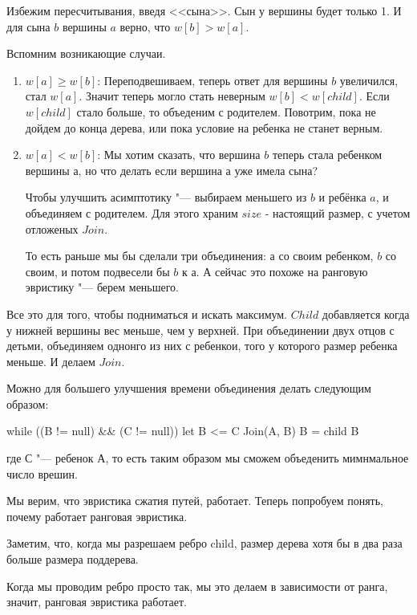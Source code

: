 Избежим пересчитывания, введя <<сына>>. Сын у вершины будет только 1. И для сына $b$ вершины $a$ верно, что $w[b] > w[a]$.

Вспомним возникающие случаи.

\begin{enumerate}
\item
	$w[a] \ge w[b]$:
	Переподвешиваем, теперь ответ для вершины $b$ увеличился, стал $w[a]$.
	Значит теперь могло стать неверным $w[b] < w[child]$.
	Если $w[child]$ стало больше, то объеденим с родителем.
	Повотрим, пока не дойдем до конца дерева, или пока условие на ребенка не станет верным.

\item
	$w[a] < w[b]$:
	Мы хотим сказать, что вершина $b$ теперь стала ребенком вершины $а$, но что делать если вершина $а$ уже имела сына?


	Чтобы улучшить асимптотику "--- выбираем меньшего из $b$ и ребёнка $a$, и объединяем с родителем.
	Для этого храним $size$ - настоящий размер, с учетом отложеных $Join$.
\begin{cppcode}
Merge(a, b) { // допустим b меньше ребенка a.
    DSU.parent[b] = a; //сливаем a и b.
    Merge(a, child[b]); //сливаем a с ребенком b.
\end{cppcode}
	
	То есть раньше мы бы сделали три объединения: $а$ со своим ребенком, $b$ со своим, и потом подвесели бы $b$ к а.
	А сейчас это похоже на ранговую эвристику "--- берем меньшего.
\end{enumerate}

\begin{Rem}
	Все это для того, чтобы подниматься и искать максимум.
	$Child$ добавляется когда у нижней вершины вес меньше, чем у верхней.
	При объединении двух отцов с детьми, объединяем однонго из них с ребенкои, того у которого размер ребенка меньше. И делаем $Join$.


	Можно для большего улучшения времени объединения делать следующим образом:
\begin{cppcode}
while ((B != null) && (C != null))
	let B <= C
	Join(A, B)
	B = child B
\end{cppcode}
	где $С$ "--- ребенок $А$, то есть таким образом мы сможем объеденить мимнмальное число врешин.
\end{Rem}


Мы верим, что эвристика сжатия путей, работает. Теперь попробуем понять, почему работает ранговая эвристика. 

Заметим, что, когда мы разрешаем ребро child, размер дерева хотя бы в два раза больше размера поддерева. 

Когда мы проводим ребро просто так, мы это делаем в зависимости от ранга, значит, ранговая эвристика работает. 

